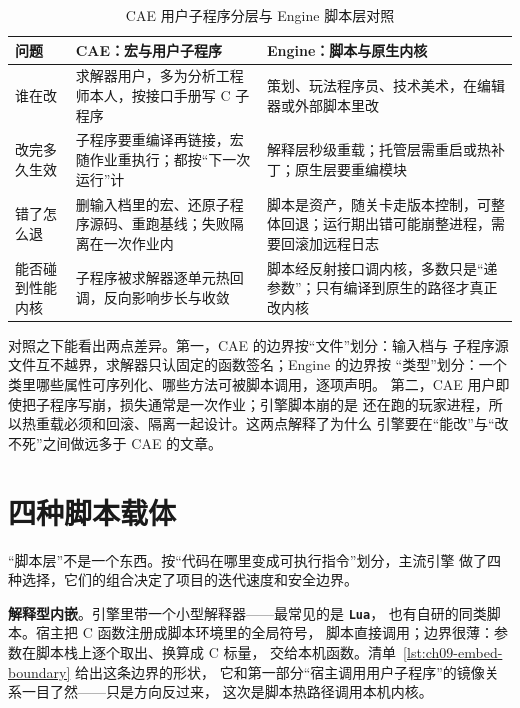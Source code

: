 \documentclass[12pt,a4paper,fontset=fandol]{ctexbook}
\newcommand{\Lib}[1]{\textbf{\texttt{#1}}}
\newcommand{\Lang}[1]{\textsf{#1}}
\newcommand{\CL}{\Lang{C}}
\newcommand{\DomCAE}{\Lang{CAE}}
\newcommand{\DomEngine}{\Lang{Engine}}
\begin{document}
\begin{table}[ht]
\centering
\caption{\DomCAE{} 用户子程序分层与 \DomEngine{} 脚本层对照}
\label{tab:ch09-layer-contrast}
\begin{tabular}{>{\raggedright\arraybackslash}p{}
                >{\raggedright\arraybackslash}p{}
                >{\raggedright\arraybackslash}p{}}
\toprule
\textbf{问题} & \textbf{\DomCAE{}：宏与用户子程序} & \textbf{\DomEngine{}：脚本与原生内核} \\
\midrule
谁在改 & 求解器用户，多为分析工程师本人，按接口手册写 \CL{} 子程序 & 策划、玩法程序员、技术美术，在编辑器或外部脚本里改 \\
改完多久生效 & 子程序要重编译再链接，宏随作业重执行；都按``下一次运行''计 & 解释层秒级重载；托管层需重启或热补丁；原生层要重编模块 \\
错了怎么退 & 删输入档里的宏、还原子程序源码、重跑基线；失败隔离在一次作业内 & 脚本是资产，随关卡走版本控制，可整体回退；运行期出错可能崩整进程，需要回滚加远程日志 \\
能否碰到性能内核 & 子程序被求解器逐单元热回调，反向影响步长与收敛 & 脚本经反射接口调内核，多数只是``递参数''；只有编译到原生的路径才真正改内核 \\
\bottomrule
\end{tabular}
\end{table}

对照之下能看出两点差异。第一，\DomCAE{} 的边界按``文件''划分：输入档与
子程序源文件互不越界，求解器只认固定的函数签名；\DomEngine{} 的边界按
``类型''划分：一个类里哪些属性可序列化、哪些方法可被脚本调用，逐项声明。
第二，\DomCAE{} 用户即使把子程序写崩，损失通常是一次作业；引擎脚本崩的是
还在跑的玩家进程，所以热重载必须和回滚、隔离一起设计。这两点解释了为什么
引擎要在``能改''与``改不死''之间做远多于 \DomCAE{} 的文章。

\section{四种脚本载体}
\label{sec:ch09-four-carriers}

``脚本层''不是一个东西。按``代码在哪里变成可执行指令''划分，主流引擎
做了四种选择，它们的组合决定了项目的迭代速度和安全边界。

\textbf{解释型内嵌}。引擎里带一个小型解释器——最常见的是 \Lib{Lua}，
也有自研的同类脚本。宿主把 \CL{} 函数注册成脚本环境里的全局符号，
脚本直接调用；边界很薄：参数在脚本栈上逐个取出、换算成 \CL{} 标量，
交给本机函数。清单~\ref{lst:ch09-embed-boundary} 给出这条边界的形状，
它和第一部分``宿主调用用户子程序''的镜像关系一目了然——只是方向反过来，
这次是脚本热路径调用本机内核。
\end{document}
